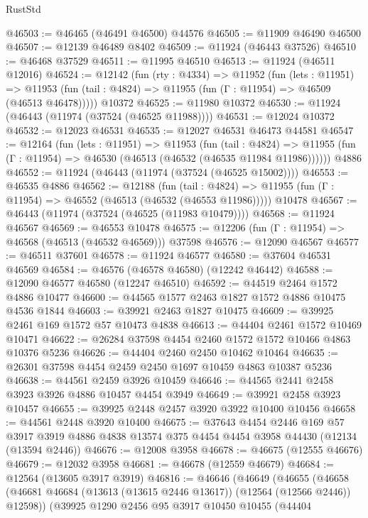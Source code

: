 \begin{lexlean}{RustStd}
\begin{coremodule}
{\begin{coremodule}
{{{{{{{{{{{{{{{{{{{{{{{{{{{{{{{{{{{{{{{{{{{{{{{{{{{{{{{{{{{{{{{{{{{{{{{{{{{{{{{{@46503 := @46465 (@46491 @46500) @44576
@46505 := @11909 @46490 @46500
@46507 := @12139 @46489 @8402
@46509 := @11924 (@46443 @37526)
@46510 := @46468 @37529
@46511 := @11995 @46510
@46513 := @11924 (@46511 @12016)
@46524 := @12142
    (fun (rty : @4334) =>
    @11952
      (fun (lets : @11951) =>
      @11953 (fun (tail : @4824) => @11955 (fun (Γ : @11954) => @46509 (@46513 @46478)))))
    @10372
@46525 := @11980 @10372
@46530 := @11924 (@46443 (@11974 (@37524 (@46525 @11988))))
@46531 := @12024 @10372
@46532 := @12023 @46531
@46535 := @12027 @46531 @46473 @44581
@46547 := @12164
    (fun (lets : @11951) =>
    @11953
      (fun (tail : @4824) =>
      @11955 (fun (Γ : @11954) => @46530 (@46513 (@46532 (@46535 @11984 @11986))))))
    @4886
@46552 := @11924 (@46443 (@11974 (@37524 (@46525 @15002))))
@46553 := @46535 @4886
@46562 := @12188
    (fun (tail : @4824) => @11955 (fun (Γ : @11954) => @46552 (@46513 (@46532 (@46553 @11986)))))
    @10478
@46567 := @46443 (@11974 (@37524 (@46525 (@11983 @10479))))
@46568 := @11924 @46567
@46569 := @46553 @10478
@46575 := @12206 (fun (Γ : @11954) => @46568 (@46513 (@46532 @46569))) @37598
@46576 := @12090 @46567
@46577 := @46511 @37601
@46578 := @11924 @46577
@46580 := @37604 @46531 @46569
@46584 := @46576 (@46578 @46580) (@12242 @46442)
@46588 := @12090 @46577 @46580 (@12247 @46510)
@46592 := @44519 @2464 @1572 @4886 @10477
@46600 := @44565 @1577 @2463 @1827 @1572 @4886 @10475 @4536 @1844
@46603 := @39921 @2463 @1827 @10475
@46609 := @39925 @2461 @169 @1572 @57 @10473 @4838
@46613 := @44404 @2461 @1572 @10469 @10471
@46622 := @26284 @37598 @4454 @2460 @1572 @1572 @10466 @4863 @10376 @5236
@46626 := @44404 @2460 @2450 @10462 @10464
@46635 := @26301 @37598 @4454 @2459 @2450 @1697 @10459 @4863 @10387 @5236
@46638 := @44561 @2459 @3926 @10459
@46646 := @44565 @2441 @2458 @3923 @3926 @4886 @10457 @4454 @3949
@46649 := @39921 @2458 @3923 @10457
@46655 := @39925 @2448 @2457 @3920 @3922 @10400 @10456
@46658 := @44561 @2448 @3920 @10400
@46675 := @37643
    @4454
    @2446
    @169
    @57
    @3917
    @3919
    @4886
    @4838
    @13574
    @375
    @4454
    @4454
    @3958
    @44430
    (@12134 (@13594 @2446))
@46676 := @12008 @3958
@46678 := @46675 (@12555 @46676)
@46679 := @12032 @3958
@46681 := @46678 (@12559 @46679)
@46684 := @12564 (@13605 @3917 @3919)
@46816 := @46646
    (@46649
      (@46655
        (@46658 (@46681 @46684 (@13613 (@13615 @2446 @13617)) (@12564 (@12566 @2446)) @12598))
        (@39925
          @1290
          @2456
          @95
          @3917
          @10450
          @10455
          (@44404
}}}}}}}}}}}}}}}}}}}}}}}}}}}}}}}}}}}}}}}}}}}}}}}}}}}}}}}}}}}}}}}}}}}}}}}}}}}}}}}}
\end{coremodule}}
\end{coremodule}
\end{lexlean}
